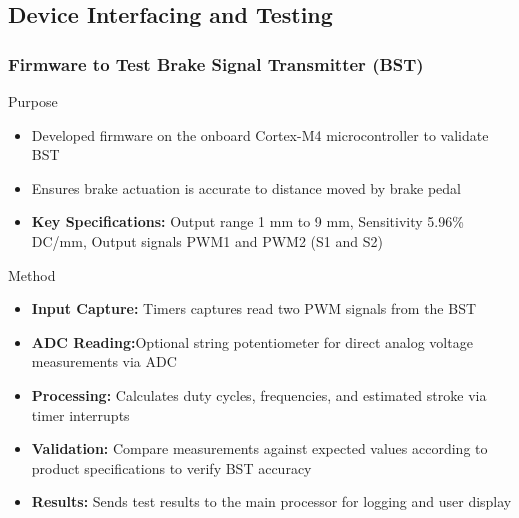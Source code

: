 \documentclass[8pt,compress,aspectratio=169]{beamer}
\newcommand\LightBold[1]{\textcolor{VSBlueLight}{\textbf{#1}}}
\begin{document}
\subsection{Device Interfacing and Testing}
\begin{frame}
  \frametitle{Firmware to Test Brake Signal Transmitter (BST)}
  \begin{block}{Purpose}
    \small{
      \begin{itemize}
        \item Developed firmware on the onboard Cortex-M4 microcontroller to validate BST
        \item Ensures brake actuation is accurate to distance moved by brake pedal
        \item \LightBold{Key Specifications:} Output range 1 mm to 9 mm, Sensitivity 5.96\% DC/mm, Output signals PWM1 and PWM2 (S1 and S2)
      \end{itemize}
    }
  \end{block}
  \hspace{-0.5cm}
  \begin{minipage}{0.485\textwidth}
    \begin{block}{Method}
      \small{
        \begin{itemize}
          \item \LightBold{Input Capture:} Timers captures read two PWM signals from the BST
          \item \LightBold{ADC Reading:}Optional string potentiometer for direct analog voltage measurements via ADC 
          \item \LightBold{Processing:} Calculates duty cycles, frequencies, and estimated stroke via timer interrupts
          \item \LightBold{Validation:} Compare measurements against expected values according to product specifications to verify BST accuracy
          \item \LightBold{Results:} Sends test results to the main processor for logging and user display
        \end{itemize}
      }
    \end{block}
  \end{minipage}
  \hfill
  \begin{minipage}{0.50\textwidth}
    \begin{figure}
      \centering

\end{figure}
\end{minipage}
\end{frame}
\end{document}
